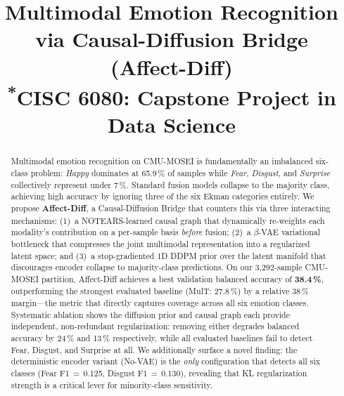\documentclass[conference]{IEEEtran}
\begin{document}
\title{Multimodal Emotion Recognition via Causal-Diffusion Bridge (Affect-Diff)\\
{\footnotesize \textsuperscript{*}CISC 6080: Capstone Project in Data Science}}

\author{
}

\maketitle

\begin{abstract}
Multimodal emotion recognition on CMU-MOSEI is fundamentally an imbalanced
six-class problem: \emph{Happy} dominates at 65.9\,\% of samples while
\emph{Fear}, \emph{Disgust}, and \emph{Surprise} collectively represent under
7\,\%.  Standard fusion models collapse to the majority class, achieving high
accuracy by ignoring three of the six Ekman categories entirely.  We propose
\textbf{Affect-Diff}, a Causal-Diffusion Bridge that counters this via three
interacting mechanisms: (1)~a NOTEARS-learned causal graph that dynamically
re-weights each modality's contribution on a per-sample basis \emph{before}
fusion; (2)~a $\beta$-VAE variational bottleneck that compresses the joint
multimodal representation into a regularized latent space; and (3)~a
stop-gradiented 1D DDPM prior over the latent manifold that discourages encoder
collapse to majority-class predictions.  On our 3{,}292-sample CMU-MOSEI
partition, Affect-Diff achieves a best validation balanced accuracy of
\textbf{38.4\,\%}, outperforming the strongest evaluated baseline (MulT:
27.8\,\%) by a relative 38\,\% margin---the metric that directly captures
coverage across all six emotion classes.  Systematic ablation shows the
diffusion prior and causal graph each provide independent, non-redundant
regularization: removing either degrades balanced accuracy by 24\,\% and
13\,\% respectively, while all evaluated baselines fail to detect Fear,
Disgust, and Surprise at all.  We additionally surface a novel finding:
the deterministic encoder variant (No-VAE) is the \emph{only} configuration
that detects all six classes (Fear F1$\,{=}\,$0.125, Disgust F1$\,{=}\,$0.130),
revealing that KL regularization strength is a critical lever for minority-class
sensitivity.
\end{abstract}
\end{document}
